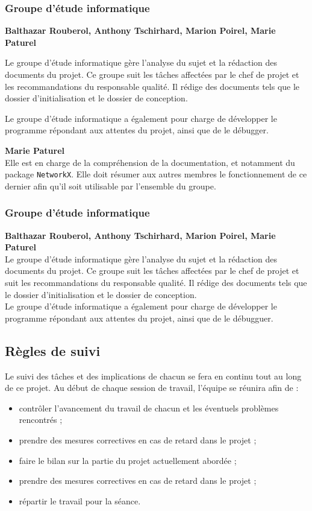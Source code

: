 \subsubsection{Groupe d'étude informatique}
\textbf{Balthazar Rouberol, Anthony Tschirhard, Marion Poirel, Marie Paturel}

Le groupe d'étude informatique gère l'analyse du sujet et la rédaction des documents du projet. Ce groupe suit les tâches affectées par le chef de projet et les recommandations du responsable qualité. Il rédige des documents tels que le dossier d'initialisation et le dossier de conception.

Le groupe d'étude informatique a également pour charge de développer le programme répondant aux attentes du projet, ainsi que de le débugger.


\textbf{Marie Paturel}\\
Elle est en charge de la compréhension de la documentation, et notamment du package \texttt{NetworkX}. Elle doit résumer aux autres membres le fonctionnement de ce dernier afin qu'il soit utilisable par l'ensemble du groupe.

\subsubsection{Groupe d'étude informatique}
\textbf{Balthazar Rouberol, Anthony Tschirhard, Marion Poirel, Marie Paturel}\\
Le groupe d'étude informatique gère l'analyse du sujet et la rédaction des documents du projet. Ce groupe suit les tâches affectées par le chef de projet et suit les recommandations du responsable qualité. Il rédige des documents tels que le dossier d'initialisation et le dossier de conception.\\
Le groupe d'étude informatique a également pour charge de développer le programme répondant aux attentes du projet, ainsi que de le débugguer.


\subsection{Règles de suivi}
Le suivi des tâches et des implications de chacun se fera en continu tout au long de ce projet. Au début de chaque session de travail, l'équipe se réunira afin de :
\begin{itemize}
  \item contrôler l'avancement du travail de chacun et les éventuels problèmes rencontrés ;
  \item prendre des mesures correctives en cas de retard dans le projet ;
  \item faire le bilan sur la partie du projet actuellement abordée ;
  \item prendre des mesures correctives en cas de retard dans le projet ;
  \item répartir le travail pour la séance.
\end{itemize}


